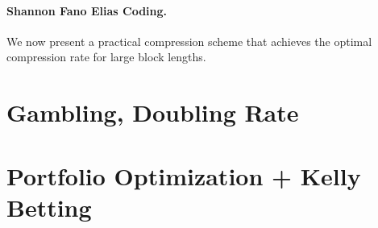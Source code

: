    \paragraph{Shannon Fano Elias Coding.} We now present a practical compression scheme that achieves the optimal compression rate for large block lengths. 

\section{Gambling, Doubling Rate} 
\label{sec:gambling}

\section{Portfolio Optimization + Kelly Betting}
